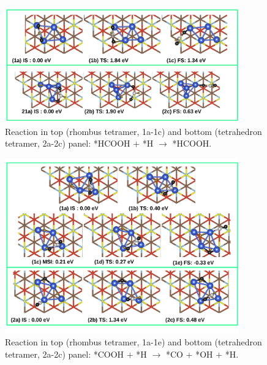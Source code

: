 \begin{figure}
  \begin{center}
    \includegraphics[width=0.9\textwidth]{./Appendix3/figures_si/p_108.jpg}
  \end{center}
    \caption{Reaction in top (rhombus tetramer, 1a-1c) and bottom (tetrahedron tetramer, 2a-2c) panel: *HCOOH + *H $\rightarrow$ *HCOOH.   }
  \label{fig:si-108}
\end{figure}

\begin{figure}
  \begin{center}
    \includegraphics[width=0.9\textwidth]{./Appendix3/figures_si/p_109.jpg}
  \end{center}
    \caption{Reaction in top (rhombus tetramer, 1a-1e) and bottom (tetrahedron tetramer, 2a-2c) panel: *COOH + *H $\rightarrow$ *CO + *OH + *H.   }
  \label{fig:si-109}
\end{figure}

